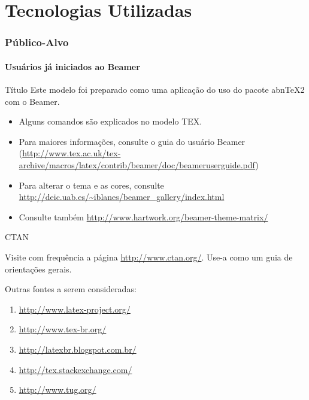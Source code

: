 \section{Tecnologias Utilizadas}\label{sec:tecnologias-utilizadas}
\begin{frame}
\frametitle{Público-Alvo}
\framesubtitle{Usuários já iniciados ao Beamer}

\begin{block}{Título}
 Este modelo foi preparado como uma aplicação do uso do pacote abnTeX2 com o 
 Beamer.
\end{block}

\begin{itemize}
 \item Alguns comandos são explicados no modelo TEX. \pause
 
 \item Para maiores informações, consulte o guia do usuário Beamer 
 (\url{http://www.tex.ac.uk/tex-archive/macros/latex/contrib/beamer/doc/beameruserguide.pdf})\pause
 
 \item Para alterar o tema e as cores, consulte 
 \url{http://deic.uab.es/~iblanes/beamer_gallery/index.html}
 
 \item Consulte também \url{http://www.hartwork.org/beamer-theme-matrix/}
\end{itemize}

\end{frame}

\begin{frame}{CTAN}

Visite com frequência a página \url{http://www.ctan.org/}. 
Use-a como um guia de orientações gerais.
\vspace{0.7cm}

Outras fontes a serem consideradas:
\begin{enumerate}
 \item \url{http://www.latex-project.org/}
 \item \url{http://www.tex-br.org/}
 \item \url{http://latexbr.blogspot.com.br/}
 \item \url{http://tex.stackexchange.com/}
 \item \url{http://www.tug.org/}
\end{enumerate}

\end{frame}


